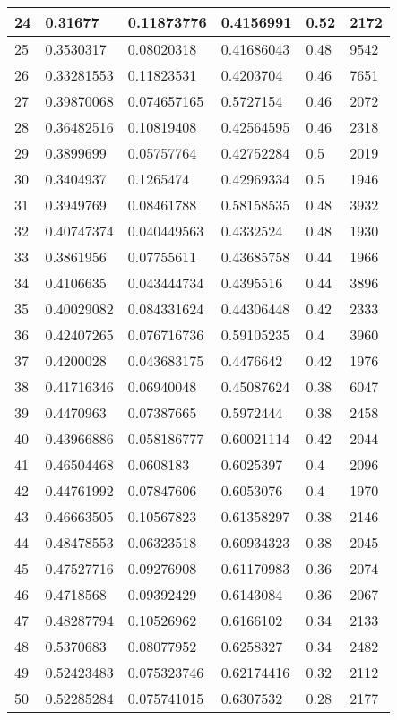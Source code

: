 \begin{longtable}{|l|l|l|l|l|l|}
24 & 0.31677 & 0.11873776 & 0.4156991 & 0.52 & 2172 \\ \hline 
25 & 0.3530317 & 0.08020318 & 0.41686043 & 0.48 & 9542 \\ \hline 
26 & 0.33281553 & 0.11823531 & 0.4203704 & 0.46 & 7651 \\ \hline 
27 & 0.39870068 & 0.074657165 & 0.5727154 & 0.46 & 2072 \\ \hline 
28 & 0.36482516 & 0.10819408 & 0.42564595 & 0.46 & 2318 \\ \hline 
29 & 0.3899699 & 0.05757764 & 0.42752284 & 0.5 & 2019 \\ \hline 
30 & 0.3404937 & 0.1265474 & 0.42969334 & 0.5 & 1946 \\ \hline 
31 & 0.3949769 & 0.08461788 & 0.58158535 & 0.48 & 3932 \\ \hline 
32 & 0.40747374 & 0.040449563 & 0.4332524 & 0.48 & 1930 \\ \hline 
33 & 0.3861956 & 0.07755611 & 0.43685758 & 0.44 & 1966 \\ \hline 
34 & 0.4106635 & 0.043444734 & 0.4395516 & 0.44 & 3896 \\ \hline 
35 & 0.40029082 & 0.084331624 & 0.44306448 & 0.42 & 2333 \\ \hline 
36 & 0.42407265 & 0.076716736 & 0.59105235 & 0.4 & 3960 \\ \hline 
37 & 0.4200028 & 0.043683175 & 0.4476642 & 0.42 & 1976 \\ \hline 
38 & 0.41716346 & 0.06940048 & 0.45087624 & 0.38 & 6047 \\ \hline 
39 & 0.4470963 & 0.07387665 & 0.5972444 & 0.38 & 2458 \\ \hline 
40 & 0.43966886 & 0.058186777 & 0.60021114 & 0.42 & 2044 \\ \hline 
41 & 0.46504468 & 0.0608183 & 0.6025397 & 0.4 & 2096 \\ \hline 
42 & 0.44761992 & 0.07847606 & 0.6053076 & 0.4 & 1970 \\ \hline 
43 & 0.46663505 & 0.10567823 & 0.61358297 & 0.38 & 2146 \\ \hline 
44 & 0.48478553 & 0.06323518 & 0.60934323 & 0.38 & 2045 \\ \hline 
45 & 0.47527716 & 0.09276908 & 0.61170983 & 0.36 & 2074 \\ \hline 
46 & 0.4718568 & 0.09392429 & 0.6143084 & 0.36 & 2067 \\ \hline 
47 & 0.48287794 & 0.10526962 & 0.6166102 & 0.34 & 2133 \\ \hline 
48 & 0.5370683 & 0.08077952 & 0.6258327 & 0.34 & 2482 \\ \hline 
49 & 0.52423483 & 0.075323746 & 0.62174416 & 0.32 & 2112 \\ \hline 
50 & 0.52285284 & 0.075741015 & 0.6307532 & 0.28 & 2177 \\ \hline 
\end{longtable}